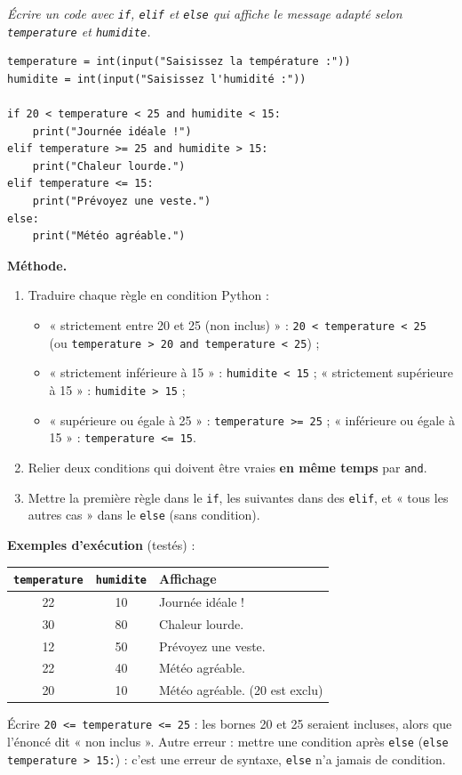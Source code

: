 \documentclass[addpoints, 11pt]{exam}
\newcommand{\enonce}[1]{\textit{#1}\par\smallskip}
\newcommand{\methode}{\par\smallskip\noindent\textbf{Méthode.}\ }
\newcommand{\code}[1]{\texttt{#1}}
\DeclareRobustCommand{\_}{\textunderscore\allowbreak}
\begin{document}
\begin{questions}
\question[2] \enonce{Écrire un code avec \code{if}, \code{elif} et \code{else} qui affiche le message adapté selon \code{temperature} et \code{humidite}.}
\begin{reponse}
\begin{lstlisting}
temperature = int(input("Saisissez la température :"))
humidite = int(input("Saisissez l'humidité :"))

if 20 < temperature < 25 and humidite < 15:
    print("Journée idéale !")
elif temperature >= 25 and humidite > 15:
    print("Chaleur lourde.")
elif temperature <= 15:
    print("Prévoyez une veste.")
else:
    print("Météo agréable.")
\end{lstlisting}
\end{reponse}
\methode
\begin{enumerate}
  \item Traduire chaque règle en condition Python :
  \begin{itemize}
    \item « strictement entre 20 et 25 (non inclus) » : \code{20 < temperature < 25}\\ (ou \code{temperature > 20 and temperature < 25}) ;
    \item « strictement inférieure à 15 » : \code{humidite < 15} ; « strictement supérieure à 15 » : \code{humidite > 15} ;
    \item « supérieure ou égale à 25 » : \code{temperature >= 25} ; « inférieure ou égale à 15 » : \code{temperature <= 15}.
  \end{itemize}
  \item Relier deux conditions qui doivent être vraies \textbf{en même temps} par \code{and}.
  \item Mettre la première règle dans le \code{if}, les suivantes dans des \code{elif}, et « tous les autres cas » dans le \code{else} (sans condition).
\end{enumerate}
\textbf{Exemples d'exécution} (testés) :
\begin{center}
\small
\begin{tabular}{|c|c|l|}
\hline
\code{temperature} & \code{humidite} & Affichage \\ \hline
22 & 10 & Journée idéale ! \\
30 & 80 & Chaleur lourde. \\
12 & 50 & Prévoyez une veste. \\
22 & 40 & Météo agréable. \\
20 & 10 & Météo agréable. (20 est exclu) \\ \hline
\end{tabular}
\end{center}

\begin{erreur}
Écrire \code{20 <= temperature <= 25} : les bornes 20 et 25 seraient incluses, alors que l'énoncé dit « non inclus ». Autre erreur : mettre une condition après \code{else} (\code{else temperature > 15:}) : c'est une erreur de syntaxe, \code{else} n'a jamais de condition.
\end{erreur}

\end{questions}
\end{document}
